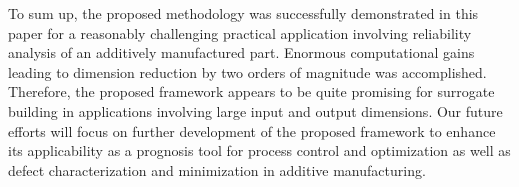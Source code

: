 To sum up, the proposed methodology was successfully demonstrated in this paper for a reasonably challenging practical
application involving reliability analysis of an additively manufactured part. 
Enormous computational gains leading to dimension reduction by two orders of magnitude was accomplished. Therefore,
the proposed framework appears to be quite promising for surrogate building in applications involving large input and
output dimensions. Our future efforts will focus on further development of the proposed framework to enhance its
applicability as a prognosis tool for process control and optimization as well as defect characterization and minimization in 
additive manufacturing.

























